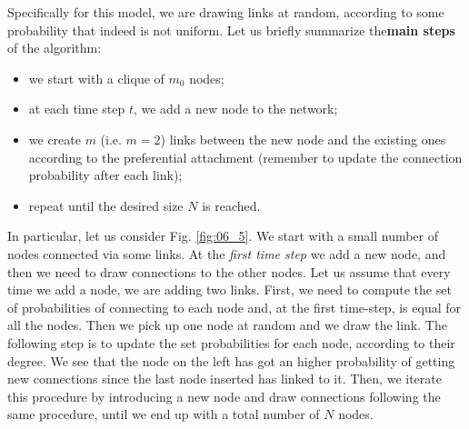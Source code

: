 \documentclass[../main/main.tex]{subfiles}
\begin{document}
Specifically for this model, we are drawing links at random, according to some probability that indeed is not uniform. Let us briefly summarize the\textbf{main steps} of the algorithm:
\begin{itemize}
\item we start with a clique of \( m_0 \) nodes;
\item at each time step \( t \), we add a new node to the network;
\item we create $m$ (i.e. $m=2$) links between the new node and the existing ones according to the preferential attachment (remember to update the connection probability after each link);
\item repeat until the desired size $N$ is reached.
\end{itemize}
In particular, let us consider Fig. \ref{fig:06_5}. We start with a small number of nodes connected via some links. At the \textit{first time step} we add a new node, and then we need to draw connections to the other nodes. Let us assume that every time we add a node, we are adding two links. First, we need to compute the set of probabilities of connecting to each node and, at the first time-step, is equal for all the nodes. Then we pick up one node at random and we draw the link. The following step is to update the set probabilities for each node, according to their degree. We see that the node on the left has got an higher probability of getting new connections since the last node inserted has linked to it. Then, we iterate this procedure by introducing a new node and draw connections following the same procedure, until we end up with a total number of \( N \) nodes.
\end{document}

